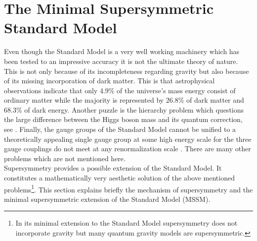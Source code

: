 
\section{The Minimal Supersymmetric Standard Model}
Even though the Standard Model is a very well working machinery which has been tested to an impressive accuracy it is not the ultimate theory of nature. This is not only because of its incompleteness regarding gravity but also because of its missing incorporation of dark matter. This is that astrophysical observations \cite{Adam:2015rua} indicate that only 4.9\% of the universe's mass energy consist of ordinary matter while the majority is represented by 26.8\% of dark matter and 68.3\% of dark energy. Another puzzle is the hierarchy problem which questions the large difference between the Higgs boson mass and its quantum correction, see \cite{Martin:1997ns}. Finally, the gauge groups of the Standard Model cannot be unified to a theoretically appealing single gauge group at some high energy scale for the three gauge couplings do not meet at any renormalization scale \cite{Martin:1997ns}. There are many other problems which are not mentioned here\cite{Bach}.\\
Supersymmetry provides a possible extension of the Standard Model. It constitutes a mathematically very aesthetic solution of the above mentioned problems\footnote{In its minimal extension to the Standard Model supersymmetry does not incorporate gravity but many quantum gravity models are supersymmetric.}. This section explains briefly the mechanism of supersymmetry and the minimal supersymmetric extension of the Standard Model (MSSM).


